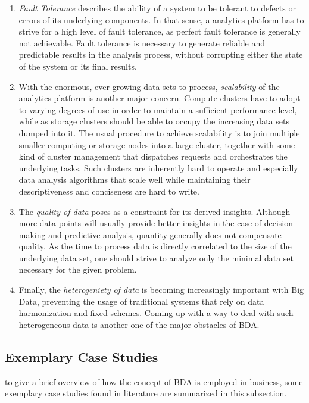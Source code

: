 \begin{enumerate}
    \item \emph{Fault Tolerance} describes the ability of a system to be tolerant to defects or errors of its underlying components. In that sense, a analytics platform has to strive for a high level of fault tolerance, as perfect fault tolerance is generally not achievable. Fault tolerance is necessary to generate reliable and predictable results in the analysis process, without corrupting either the state of the system or its final results.
    \item With the enormous, ever-growing data sets to process, \emph{scalability} of the analytics platform is another major concern. Compute clusters have to adopt to varying degrees of use in order to maintain a sufficient performance level, while as storage clusters should be able to occupy the increasing data sets dumped into it. The usual procedure to achieve scalability is to join multiple smaller computing or storage nodes into a large cluster, together with some kind of cluster management that dispatches requests and orchestrates the underlying tasks. Such clusters are inherently hard to operate and especially data analysis algorithms that scale well while maintaining their descriptiveness and conciseness are hard to write.
    \item The \emph{quality of data} poses as a constraint for its derived insights. Although more data points will usually provide better insights in the case of decision making and predictive analysis, quantity generally does not compensate quality. As the time to process data is directly correlated to the size of the underlying data set, one should strive to analyze only the minimal data set necessary for the given problem.
    \item Finally, the \emph{heterogeniety of data} is becoming increasingly important with Big Data, preventing the usage of traditional systems that rely on data harmonization and fixed schemes. Coming up with a way to deal with such heterogeneous data is another one of the major obstacles of \ac{BDA}.
\end{enumerate}

\subsection{Exemplary Case Studies}
\label{sota-bda-use-cases}

to give a brief overview of how the concept of \ac{BDA} is employed in business, some exemplary case studies found in literature are summarized in this subsection.

